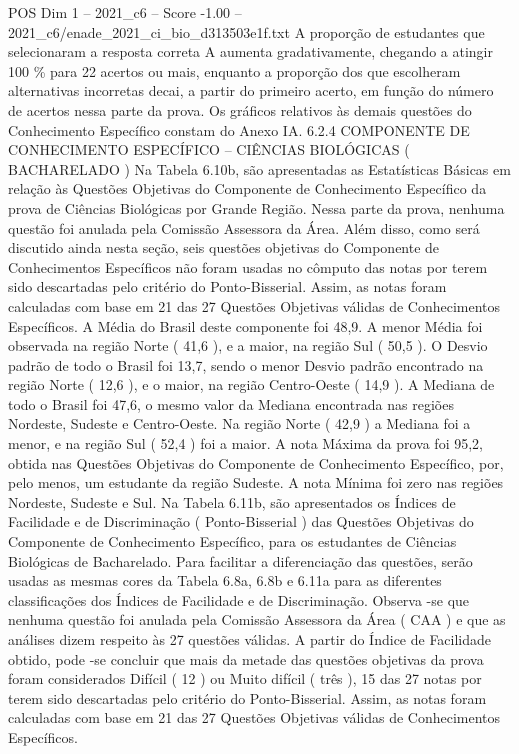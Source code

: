 \begin{textsample}{POS Dim 1 – 2021\_c6 – Score -1.00 – 2021\_c6/enade\_2021\_ci\_bio\_d313503e1f.txt}
A proporção de estudantes que selecionaram a resposta correta A aumenta gradativamente, chegando a atingir 100 \% para 22 acertos ou mais, enquanto a proporção dos que escolheram alternativas incorretas decai, a partir do primeiro acerto, em função do número de acertos nessa parte da prova.
Os gráficos relativos às demais questões do Conhecimento Específico constam do Anexo IA. 6.2.4 COMPONENTE DE CONHECIMENTO ESPECÍFICO – CIÊNCIAS BIOLÓGICAS ( BACHARELADO ) Na Tabela 6.10b, são apresentadas as Estatísticas Básicas em relação às Questões Objetivas do Componente de Conhecimento Específico da prova de Ciências Biológicas por Grande Região.
Nessa parte da prova, nenhuma questão foi anulada pela Comissão Assessora da Área.
Além disso, como será discutido ainda nesta seção, seis questões objetivas do Componente de Conhecimentos Específicos não foram usadas no cômputo das notas por terem sido descartadas pelo critério do Ponto-Bisserial.
Assim, as notas foram calculadas com base em 21 das 27 Questões Objetivas válidas de Conhecimentos Específicos.
A Média do Brasil deste componente foi 48,9.
A menor Média foi observada na região Norte ( 41,6 ), e a maior, na região Sul ( 50,5 ).
O Desvio padrão de todo o Brasil foi 13,7, sendo o menor Desvio padrão encontrado na região Norte ( 12,6 ), e o maior, na região Centro-Oeste ( 14,9 ).
A Mediana de todo o Brasil foi 47,6, o mesmo valor da Mediana encontrada nas regiões Nordeste, Sudeste e Centro-Oeste.
Na região Norte ( 42,9 ) a Mediana foi a menor, e na região Sul ( 52,4 ) foi a maior.
A nota Máxima da prova foi 95,2, obtida nas Questões Objetivas do Componente de Conhecimento Específico, por, pelo menos, um estudante da região Sudeste.
A nota Mínima foi zero nas regiões Nordeste, Sudeste e Sul.
Na Tabela 6.11b, são apresentados os Índices de Facilidade e de Discriminação ( Ponto-Bisserial ) das Questões Objetivas do Componente de Conhecimento Específico, para os estudantes de Ciências Biológicas de Bacharelado.
Para facilitar a diferenciação das questões, serão usadas as mesmas cores da Tabela 6.8a, 6.8b e 6.11a para as diferentes classificações dos Índices de Facilidade e de Discriminação.
Observa -se que nenhuma questão foi anulada pela Comissão Assessora da Área ( CAA ) e que as análises dizem respeito às 27 questões válidas.
A partir do Índice de Facilidade obtido, pode -se concluir que mais da metade das questões objetivas da prova foram considerados Difícil ( 12 ) ou Muito difícil ( três ), 15 das 27 notas por terem sido descartadas pelo critério do Ponto-Bisserial.
Assim, as notas foram calculadas com base em 21 das 27 Questões Objetivas válidas de Conhecimentos Específicos.

\end{textsample}
